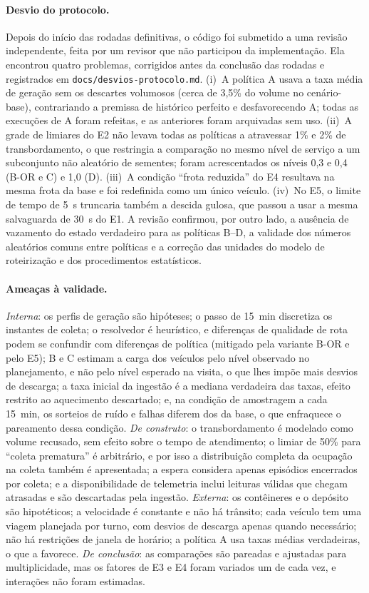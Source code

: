 \paragraph{Desvio do protocolo.}
Depois do início das rodadas definitivas, o código foi submetido a uma revisão
independente, feita por um revisor que não participou da implementação. Ela
encontrou quatro problemas, corrigidos antes da conclusão das rodadas e
registrados em \texttt{docs/desvios-protocolo.md}. (i)~A política A usava a
taxa média de geração sem os descartes volumosos (cerca de 3,5\% do volume no
cenário-base), contrariando a premissa de histórico perfeito e desfavorecendo
A; todas as execuções de A foram refeitas, e as anteriores foram arquivadas sem
uso. (ii)~A grade de limiares do E2 não levava todas as políticas a atravessar
1\% e 2\% de transbordamento, o que restringia a comparação no mesmo nível de
serviço a um subconjunto não aleatório de sementes; foram acrescentados os
níveis 0,3 e 0,4 (B-OR e C) e 1,0 (D). (iii)~A condição ``frota reduzida'' do
E4 resultava na mesma frota da base e foi redefinida como um único veículo.
(iv)~No E5, o limite de tempo de 5~s truncaria também a descida gulosa, que
passou a usar a mesma salvaguarda de 30~s do E1. A revisão confirmou, por
outro lado, a ausência de vazamento do estado verdadeiro para as políticas
B--D, a validade dos números aleatórios comuns entre políticas e a correção
das unidades do modelo de roteirização e dos procedimentos estatísticos.

\paragraph{Ameaças à validade.}
\emph{Interna}: os perfis de geração são hipóteses; o passo de 15~min
discretiza os instantes de coleta; o resolvedor é heurístico, e diferenças de
qualidade de rota podem se confundir com diferenças de política (mitigado pela
variante B-OR e pelo E5); B e C estimam a carga dos veículos pelo nível
observado no planejamento, e não pelo nível esperado na visita, o que lhes
impõe mais desvios de descarga; a taxa inicial da ingestão é a mediana
verdadeira das taxas, efeito restrito ao aquecimento descartado; e, na condição
de amostragem a cada 15~min, os sorteios de ruído e falhas diferem dos da base,
o que enfraquece o pareamento dessa condição. \emph{De construto}: o transbordamento é modelado
como volume recusado, sem efeito sobre o tempo de atendimento; o limiar de
50\% para ``coleta prematura'' é arbitrário, e por isso a distribuição completa
da ocupação na coleta também é apresentada; a espera considera apenas
episódios encerrados por coleta; e a disponibilidade de telemetria inclui
leituras válidas que chegam atrasadas e são descartadas pela ingestão. \emph{Externa}: os contêineres e o
depósito são hipotéticos; a velocidade é constante e não há trânsito; cada
veículo tem uma viagem planejada por turno, com desvios de descarga apenas
quando necessário; não há restrições de janela de horário; a política A usa
taxas médias verdadeiras, o que a favorece. \emph{De conclusão}: as
comparações são pareadas e ajustadas para multiplicidade, mas os fatores de E3
e E4 foram variados um de cada vez, e interações não foram estimadas.
